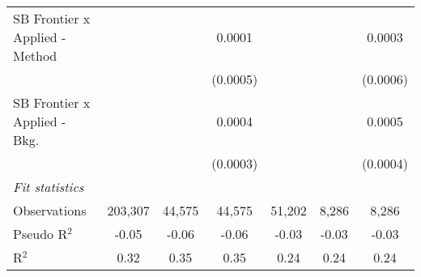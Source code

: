 \begin{tabular}{lcccccc}
   SB Frontier x Applied - Method &                 &                 & 0.0001          &                 &                & 0.0003\\   
                                  &                 &                 & (0.0005)        &                 &                & (0.0006)\\   
   SB Frontier x Applied - Bkg.   &                 &                 & 0.0004          &                 &                & 0.0005\\   
                                  &                 &                 & (0.0003)        &                 &                & (0.0004)\\   
   \midrule
   \emph{Fit statistics}\\
   Observations                   & 203,307         & 44,575          & 44,575          & 51,202          & 8,286          & 8,286\\  
   Pseudo R$^2$                   & -0.05           & -0.06           & -0.06           & -0.03           & -0.03          & -0.03\\  
   R$^2$                          & 0.32            & 0.35            & 0.35            & 0.24            & 0.24           & 0.24\\  
   

\end{tabular}
